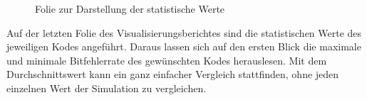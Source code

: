 \begin{figure}[th]
\centering
{}
\caption{Folie zur Darstellung der statistische Werte}
\label{pic:ChannelcodingSimulationStatistic}
\end{figure}

Auf der letzten Folie des Visualisierungsberichtes sind die statistischen Werte des jeweiligen Kodes angeführt. Daraus lassen sich auf den ersten Blick die maximale und minimale Bitfehlerrate des gewünschten Kodes herauslesen. Mit dem Durchschnittswert kann ein ganz einfacher Vergleich stattfinden, ohne jeden einzelnen Wert der Simulation zu vergleichen.

\FloatBarrier